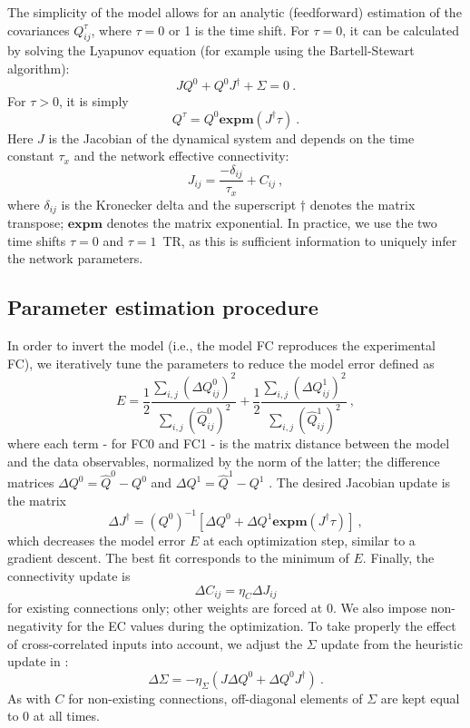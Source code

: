 \documentclass{article}
\newcommand{\expm}{\mathbf{expm}}
\newcommand{\transp}{\dag}
\begin{document}
The simplicity of the model allows for an analytic (feedforward) estimation of the covariances $Q^\tau_{ij}$, where $\tau = 0$ or 1 is the time shift.
For $\tau = 0$, it can be calculated by solving the Lyapunov equation (for example using the Bartell-Stewart algorithm): 
\begin{equation}
J Q^0 + Q^0 J^\transp + \Sigma = 0
\ .
\end{equation}
For $\tau > 0$, it is simply
\begin{equation}
Q^\tau = Q^0 \expm(J^\transp \tau)
\ .
\end{equation}
Here $J$ is the Jacobian of the dynamical system and depends on the time constant $\tau_x$ and the network effective connectivity: 
\begin{equation}
J_{ij} = \frac{-\delta_{ij}}{\tau_x} + C_{ij}
\ ,
\end{equation}
where $\delta_{ij}$ is the Kronecker delta and the superscript $\transp$ denotes the matrix transpose;  $\expm$ denotes the matrix exponential. 
In practice, we use the two time shifts $\tau = 0$ and $\tau = 1$~TR, as this is sufficient information to uniquely infer the network parameters.

\subsection{Parameter estimation procedure}

In order to invert the model (i.e., the model FC reproduces the experimental FC), we iteratively tune the parameters to reduce the model error defined as 
\begin{equation} \label{eq_error_mod}
E = \frac{1}{2} \frac{\sum_{i,j} (\Delta Q^0_{ij})^2}{\sum_{i,j} (\hat{Q}^0_{ij})^2} + \frac{1}{2} \frac{\sum_{i,j} (\Delta Q^1_{ij})^2}{\sum_{i,j} (\hat{Q}^1_{ij})^2} \ , 
\end{equation}
where each term - for FC0 and FC1 - is the matrix distance between the model and the data observables, normalized by the norm of the latter; the difference matrices $\Delta Q^0 = \widehat{Q}^0 - Q^0$ and $\Delta Q^1 = \widehat{Q}^1 - Q^1$ .
The desired Jacobian update is the matrix
\begin{equation}
\Delta J^\transp = (Q^0)^{-1} [\Delta Q^0 + \Delta Q^1 \expm(J^\transp \tau)]
\ ,
\end{equation}
which decreases the model error $E$ at each optimization step, similar to a gradient descent. The best fit corresponds to the minimum of $E$. Finally, the connectivity update is
\begin{equation}
\Delta C_{ij} = \eta_C \Delta J_{ij}
\end{equation}
for existing connections only; other weights are forced at 0. We also impose non-negativity for the EC values during the optimization. 
To take properly the effect of cross-correlated inputs into account, we adjust the $\Sigma$ update from the heuristic update in \cite{Gilson_PCB_2016}:
\begin{equation}
\Delta \Sigma = - \eta_\Sigma (J \Delta Q^0 + \Delta Q^0 J^\transp)
\ .
\end{equation}
As with $C$ for non-existing connections, off-diagonal elements of $\Sigma$ are kept equal to 0 at all times.
\end{document}

